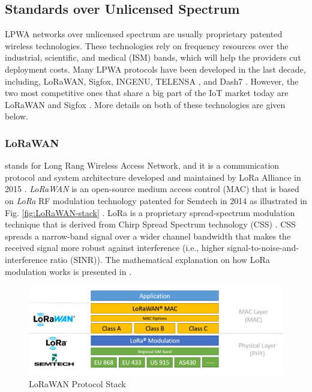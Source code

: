 \documentclass[]{IEEEtran}
\begin{document}
\subsection{Standards over Unlicensed Spectrum}
\label{sec:2-1}

LPWA networks over unlicensed spectrum are usually proprietary patented wireless technologies. These technologies rely on frequency resources over the industrial, scientific, and medical (ISM) bands, which will help the providers cut deployment costs. Many LPWA protocols have been developed in the last decade, including, LoRaWAN, Sigfox\cite{ayoub2018internet}, INGENU\cite{ogbodo2022survey}, TELENSA \cite{raza2017low}, and Dash7 \cite{augustin2016study}. However, the two most competitive ones that share a big part of the IoT market today are LoRaWAN and Sigfox \cite{ding_iot_2020}. More details on both of these technologies are given below.

\subsubsection{LoRaWAN}
\label{sec:2-1-1}

stands for Long Rang Wireless Access Network, and it is a communication protocol and system architecture developed and maintained by LoRa Alliance in 2015 \cite{LoRaWAN_spec}. \textit{LoRaWAN} is an open-source medium access control (MAC) that is based on \textit{LoRa} RF modulation technology patented for Semtech in 2014 \cite{seller_low_2016} as illustrated in Fig. \ref{fig:LoRaWAN-stack} \cite{LoRaWAN_spec}. LoRa is a proprietary spread-spectrum modulation technique that is derived from  Chirp Spread Spectrum technology (CSS) \cite{sforza_communications_2013}. CSS spreads a narrow-band signal over a wider channel bandwidth that makes the received signal more robust against interference (i.e., higher signal-to-noise-and-interference ratio (SINR)). The mathematical explanation on how LoRa modulation works is presented in \cite{vangelista2017frequency}.


\begin{figure}
    \centering
        \includegraphics[width=\linewidth]{Pictures/LoRaWAN_stack-Semtech.png}
    \caption{LoRaWAN Protocol Stack}
    \label{fig:LoRaWAN-stack-Semtech}
\end{figure}
\end{document}
